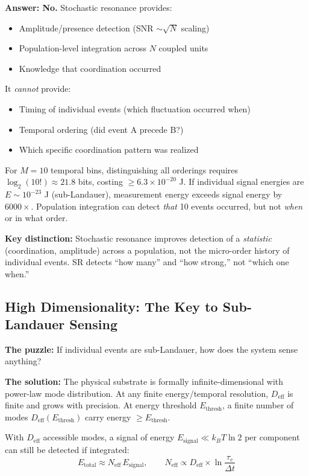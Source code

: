 \documentclass[12pt]{article}
\numberwithin{equation}{section}
\begin{document}
\textbf{Answer: No.} Stochastic resonance provides:
\begin{itemize}
\item Amplitude/presence detection (SNR $\sim \sqrt{N}$ scaling)
\item Population-level integration across $N$ coupled units
\item Knowledge that coordination occurred
\end{itemize}

It \emph{cannot} provide:
\begin{itemize}
\item Timing of individual events (which fluctuation occurred when)
\item Temporal ordering (did event A precede B?)
\item Which specific coordination pattern was realized
\end{itemize}

For $M=10$ temporal bins, distinguishing all orderings requires $\log_2(10!) \approx 21.8$ bits, costing $\ge 6.3\times10^{-20}$ J. If individual signal energies are $E \sim 10^{-23}$ J (sub-Landauer), measurement energy exceeds signal energy by $6000\times$. Population integration can detect \emph{that} 10 events occurred, but not \emph{when} or in what order.

\textbf{Key distinction:} Stochastic resonance improves detection of a \emph{statistic} (coordination, amplitude) across a population, not the micro-order history of individual events. SR detects ``how many'' and ``how strong,'' not ``which one when.''

\subsection{High Dimensionality: The Key to Sub-Landauer Sensing}

\textbf{The puzzle:} If individual events are sub-Landauer, how does the system sense anything?

\textbf{The solution:} The physical substrate is formally infinite-dimensional with power-law mode distribution. At any finite energy/temporal resolution, $D_{\text{eff}}$ is finite and grows with precision. At energy threshold $E_{\text{thresh}}$, a finite number of modes $D_{\text{eff}}(E_{\text{thresh}})$ carry energy $\ge E_{\text{thresh}}$.

With $D_{\text{eff}}$ accessible modes, a signal of energy $E_{\text{signal}} \ll k_BT\ln 2$ per component can still be detected if integrated:
\begin{equation}
E_{\text{total}} \approx N_{\text{eff}} \, E_{\text{signal}}, \qquad 
N_{\text{eff}} \propto D_{\text{eff}} \times \ln\!\frac{\tau_c}{\Delta t}
\end{equation}
\end{document}
